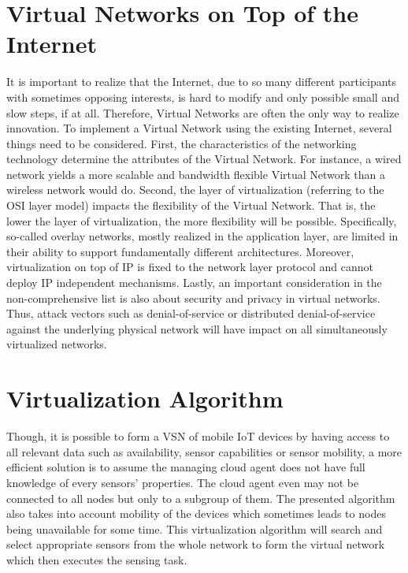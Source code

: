 \section{Virtual Networks on Top of the Internet}
It is important to realize that the Internet, due to so many different participants with sometimes opposing interests, is hard to modify and only possible small and slow steps, if at all. Therefore, Virtual Networks are often the only way to realize innovation. To implement a Virtual Network using the existing Internet, several things need to be considered. First, the characteristics of the networking technology determine the attributes of the Virtual Network. For instance, a wired network yields a more scalable and bandwidth flexible Virtual Network than a wireless network would do. \cite{Chowdhury} Second, the layer of virtualization (referring to the OSI layer model) impacts the flexibility of the Virtual Network. That is, the lower the layer of virtualization, the more flexibility will be possible. Specifically, so-called overlay networks, mostly realized in the application layer, are limited in their ability to support fundamentally different architectures. \cite{Chowdhury} Moreover, virtualization on top of IP is fixed to the network layer protocol and cannot deploy IP independent mechanisms.  \cite{Chowdhury} Lastly, an important consideration in the non-comprehensive list is also about security and privacy in virtual networks. Thus, attack vectors such as denial-of-service or distributed denial-of-service against the underlying physical network will have impact on all simultaneously virtualized networks.

\section{Virtualization Algorithm}
Though, it is possible to form a VSN of mobile IoT devices by having access to all relevant data such as availability, sensor capabilities or sensor mobility, a more efficient solution is to assume the managing cloud agent does not have full knowledge of every sensors’ properties. \cite{Sherif} The cloud agent even may not be connected to all nodes but only to a subgroup of them. The presented algorithm also takes into account mobility of the devices which sometimes leads to nodes being unavailable for some time. \cite{Sherif}
This virtualization algorithm will search and select appropriate sensors from the whole network to form the virtual network which then executes the sensing task.









